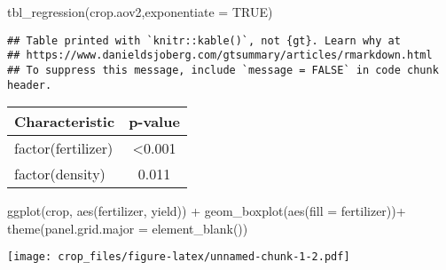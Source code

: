 \documentclass[
]{article}
\newenvironment{Shaded}{\begin{snugshade}}{\end{snugshade}}
\newcommand{\AttributeTok}[1]{\textcolor[rgb]{0.77,0.63,0.00}{#1}}
\newcommand{\ConstantTok}[1]{\textcolor[rgb]{0.00,0.00,0.00}{#1}}
\newcommand{\FunctionTok}[1]{\textcolor[rgb]{0.00,0.00,0.00}{#1}}
\newcommand{\NormalTok}[1]{#1}
\newcommand{\SpecialCharTok}[1]{\textcolor[rgb]{0.00,0.00,0.00}{#1}}
\begin{document}
\begin{Shaded}
\begin{Highlighting}[]
\FunctionTok{tbl\_regression}\NormalTok{(crop.aov2,}\AttributeTok{exponentiate =} \ConstantTok{TRUE}\NormalTok{)}
\end{Highlighting}
\end{Shaded}

\begin{verbatim}
## Table printed with `knitr::kable()`, not {gt}. Learn why at
## https://www.danieldsjoberg.com/gtsummary/articles/rmarkdown.html
## To suppress this message, include `message = FALSE` in code chunk header.
\end{verbatim}

\begin{longtable}[]{@{}lc@{}}
\toprule
\textbf{Characteristic} & \textbf{p-value} \\
\midrule
\endhead
factor(fertilizer) & \textless0.001 \\
factor(density) & 0.011 \\
\bottomrule
\end{longtable}

\begin{Shaded}
\begin{Highlighting}[]
\FunctionTok{ggplot}\NormalTok{(crop, }\FunctionTok{aes}\NormalTok{(fertilizer, yield)) }\SpecialCharTok{+} \FunctionTok{geom\_boxplot}\NormalTok{(}\FunctionTok{aes}\NormalTok{(}\AttributeTok{fill =}\NormalTok{ fertilizer))}\SpecialCharTok{+}
  \FunctionTok{theme}\NormalTok{(}\AttributeTok{panel.grid.major =} \FunctionTok{element\_blank}\NormalTok{())}
\end{Highlighting}
\end{Shaded}

\texttt{[image: crop\_files/figure-latex/unnamed-chunk-1-2.pdf]}
\end{document}
